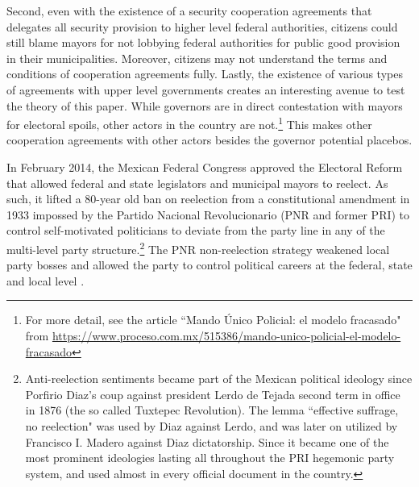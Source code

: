 \documentclass[12pt]{amsart}
\makeatletter
\def\section{\@startsection{section}{1}
	\z@{1.0\linespacing\@plus\linespacing}{.5\linespacing}{\Large}}
\numberwithin{equation}{section}
\theoremstyle{definition}
\theoremstyle{definition}
\theoremstyle{definition}
\makeatother
\begin{document}
Second, even with the existence of a security cooperation agreements that delegates all security provision to higher level federal authorities, citizens could still blame mayors for not lobbying federal authorities for public good provision in their municipalities. Moreover, citizens may not understand the terms and conditions of cooperation agreements fully. Lastly, the existence of various types of agreements with upper level governments creates an interesting avenue to test the theory of this paper. While governors are in direct contestation with mayors for electoral spoils, other actors in the country are not.\footnote{For more detail, see the article ``Mando \'Unico Policial: el modelo fracasado" from \url{https://www.proceso.com.mx/515386/mando-unico-policial-el-modelo-fracasado}} This makes other cooperation agreements with other actors besides the governor potential placebos.   


\section{Term Limit Reform of 2014 \label{sec:reform}}   
       
In February 2014, the Mexican Federal Congress approved the Electoral Reform that allowed federal and state legislators and municipal mayors to reelect. As such, it lifted a 80-year old ban on reelection from a constitutional amendment in 1933 impossed by the Partido Nacional Revolucionario (PNR and former PRI) to control self-motivated politicians to deviate from the party line in any of the multi-level party structure.\footnote{Anti-reelection sentiments became part of the Mexican political ideology since Porfirio Diaz's coup against president Lerdo de Tejada second term in office in 1876 (the so called Tuxtepec Revolution). The lemma ``effective suffrage, no reelection" was used by Diaz against Lerdo, and was later on utilized by Francisco I. Madero against Diaz dictatorship. Since it became one of the most prominent ideologies lasting all throughout the PRI hegemonic party system, and used almost in every official document in the country.} The PNR non-reelection strategy weakened local party bosses and allowed the party to control political careers at the federal, state and local level \citep{weldon_2003}. 
\end{document}
